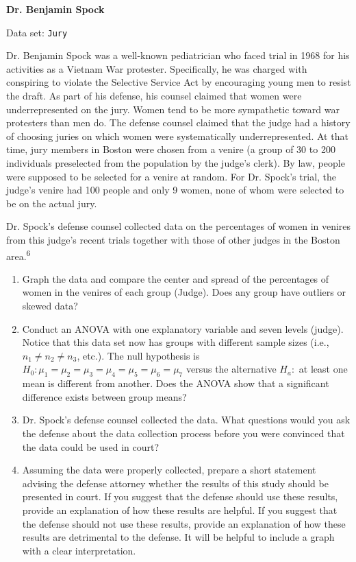 \documentclass[
]{report}
\begin{document}
\begin{list}{E..}{ \setlength{\itemsep}{1.2em}}
  \item \textbf{Dr. Benjamin Spock}

Data set: \texttt{Jury}

Dr. Benjamin Spock was a well-known pediatrician who faced trial in 1968 for his activities as a Vietnam War protester. Specifically, he was charged with conspiring to violate the Selective Service Act by encouraging young men to resist the draft. As part of his defense, his counsel claimed that women were underrepresented on the jury. Women tend to be more sympathetic toward war protesters than men do. The defense counsel claimed that the judge had a history of choosing juries on which women were systematically underrepresented. At that time, jury members in Boston were chosen from a venire (a group of 30 to 200 individuals preselected from the population by the judge’s clerk). By law, people were supposed to be selected for a venire at random. For Dr. Spock’s trial, the judge’s venire had 100 people and only 9 women, none of whom were selected to be on the actual jury.

Dr. Spock’s defense counsel collected data on the percentages of women in venires from this judge’s recent trials together with those of other judges in the Boston area.\textsuperscript{6}

    \begin{enumerate}
      \item Graph the data and compare the center and spread of the percentages of women in the venires of each group (Judge). Does any group have outliers or skewed data?
      \item Conduct an ANOVA with one explanatory variable and seven levels (judge). Notice that this data set now has groups with different sample sizes (i.e., $n_1 \ne n_2 \ne n_3$, etc.). The null hypothesis is $H_0\colon \mu_1 = \mu_2 = \mu_3 = \mu_4 = \mu_5 = \mu_6 = \mu_7$ versus the alternative $H_a\colon$ at least one mean is different from another. Does the ANOVA show that a significant difference exists between group means?
      \item Dr. Spock’s defense counsel collected the data. What questions would you ask the defense about the data collection process before you were convinced that the data could be used in court?
      \item Assuming the data were properly collected, prepare a short statement advising the defense attorney whether the results of this study should be presented in court. If you suggest that the defense should use these results, provide an explanation of how these results are helpful. If you suggest that the defense should not use these results, provide an explanation of how these results are detrimental to the defense. It will be helpful to include a graph with a clear interpretation.
    \end{enumerate}


\end{list}
\end{document}
